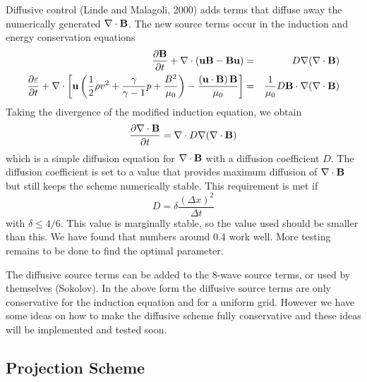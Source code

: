 Diffusive control (Linde and Malagoli, 2000) adds terms that diffuse
away the numerically generated $\nabla\cdot\mathbf{B}$. The new source terms occur in 
the induction and energy conservation equations
\begin{eqnarray}
  \frac{\partial\mathbf{B}}{\partial t} + \nabla \cdot(\mathbf{u}\mathbf{B} - \mathbf{B}\mathbf{u})
      &=& D \nabla(\nabla\cdot\mathbf{B})                    \label{q-inductiondiff} \\
  \frac{\partial\varepsilon}{\partial t}+
      \nabla \cdot \left[ \mathbf{u} \left( \frac12 \rho v^2 + 
      \frac{\gamma}{\gamma-1} p +
      \frac{B^2}{\mu_0} \right) - 
      \frac{\left(\mathbf{u}\cdot\mathbf{B}\right)\mathbf{B}}{\mu_0}\right] 
      &=& \frac{1}{\mu_0} D \mathbf{B}\cdot\nabla(\nabla\cdot\mathbf{B})             \label{q-energydiff}
\end{eqnarray}
Taking the divergence of the modified induction equation, we obtain
\begin{equation}
  \frac{\partial\nabla\cdot\mathbf{B}}{\partial t}= \nabla\cdot D \nabla(\nabla\cdot\mathbf{B}) 
\end{equation}
which is a simple diffusion equation for $\nabla\cdot\mathbf{B}$ with a diffusion
coefficient $D$. The diffusion coefficient is set to a value that provides 
maximum diffusion of $\nabla\cdot\mathbf{B}$ but still keeps the scheme numerically stable.
This requirement is met if
\begin{equation}
  D=\delta \frac{(\Delta x)^2}{\Delta t}
\end{equation}
with $\delta\le4/6$.  This value is marginally stable, so the value used
should be smaller than this.  We have found that numbers around 0.4 work
well.  More testing remains to be done to find the optimal parameter.

The diffusive source terms can be added to the 8-wave source terms, or used
by themselves (Sokolov). In the above form the diffusive source terms
are only conservative for the induction equation and for a uniform grid.
However we have some ideas on how to make the diffusive scheme fully 
conservative and these ideas will be implemented and tested soon.

\subsection{Projection Scheme \label{section:projection}}

